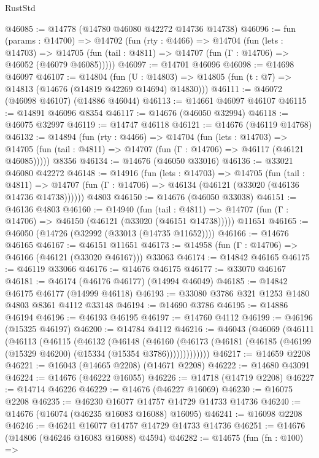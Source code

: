 \begin{lexlean}{RustStd}
\begin{coremodule}
@46085 := @14778 (@14780 @46080 @42272 @14736 @14738)
@46096 := fun (params : @14700) =>
  @14702
    (fun (rty : @4466) =>
    @14704
      (fun (lets : @14703) =>
      @14705 (fun (tail : @4811) => @14707 (fun (Γ : @14706) => @46052 (@46079 @46085)))))
@46097 := @14701 @46096
@46098 := @14698 @46097
@46107 := @14804
    (fun (U : @14803) => @14805 (fun (t : @7) => @14813 (@14676 (@14819 @42269 @14694) @14830)))
@46111 := @46072 (@46098 @46107) (@14886 @46044)
@46113 := @14661 @46097 @46107
@46115 := @14891 @46096 @8354
@46117 := @14676 (@46050 @32994)
@46118 := @46075 @32997
@46119 := @14747 @46118
@46121 := @14676 (@46119 @14768)
@46132 := @14894
    (fun (rty : @4466) =>
    @14704
      (fun (lets : @14703) =>
      @14705 (fun (tail : @4811) => @14707 (fun (Γ : @14706) => @46117 (@46121 @46085)))))
    @8356
@46134 := @14676 (@46050 @33016)
@46136 := @33021 @46080 @42272
@46148 := @14916
    (fun (lets : @14703) =>
    @14705
      (fun (tail : @4811) =>
      @14707 (fun (Γ : @14706) => @46134 (@46121 (@33020 (@46136 @14736 @14738))))))
    @4803
@46150 := @14676 (@46050 @33038)
@46151 := @46136 @4803
@46160 := @14940
    (fun (tail : @4811) => @14707 (fun (Γ : @14706) => @46150 (@46121 (@33020 (@46151 @14738)))))
    @11651
@46165 := @46050 (@14726 (@32992 (@33013 (@14735 @11652))))
@46166 := @14676 @46165
@46167 := @46151 @11651
@46173 := @14958 (fun (Γ : @14706) => @46166 (@46121 (@33020 @46167))) @33063
@46174 := @14842 @46165
@46175 := @46119 @33066
@46176 := @14676 @46175
@46177 := @33070 @46167
@46181 := @46174 (@46176 @46177) (@14994 @46049)
@46185 := @14842 @46175 @46177 (@14999 @46118)
@46193 := @33080 @3786 @321 @1253 @1480 @4803 @8361 @4112 @33148
@46194 := @14690 @3786
@46195 := @14886 @46194
@46196 := @46193 @46195
@46197 := @14760 @4112
@46199 := @46196 (@15325 @46197)
@46200 := @14784 @4112
@46216 := @46043
    (@46069
      (@46111
        (@46113
          (@46115
            (@46132
              (@46148
                (@46160
                  (@46173 (@46181 (@46185 (@46199 (@15329 @46200) (@15334 (@15354 @3786)))))))))))))
@46217 := @14659 @2208
@46221 := @16043 (@14665 @2208) (@14671 @2208)
@46222 := @14680 @43091
@46224 := @14676 (@46222 @16055)
@46226 := @14718 (@14719 @2208)
@46227 := @14714 @46226
@46229 := @14676 (@46227 @16069)
@46230 := @16075 @2208
@46235 := @46230 @16077 @14757 @14729 @14733 @14736
@46240 := @14676 (@16074 (@46235 @16083 @16088) @16095)
@46241 := @16098 @2208
@46246 := @46241 @16077 @14757 @14729 @14733 @14736
@46251 := @14676 (@14806 (@46246 @16083 @16088) @4594)
@46282 := @14675
    (fun (fn : @100) =>

\end{coremodule}
\end{lexlean}
